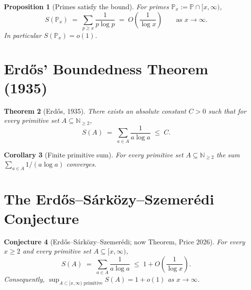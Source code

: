 \documentclass{article}
\newtheorem{theorem}{Theorem}[section]
\newtheorem{proposition}[theorem]{Proposition}
\newtheorem{corollary}[theorem]{Corollary}
\newtheorem{conjecture}[theorem]{Conjecture}
\theoremstyle{definition}
\begin{document}
\begin{proposition}[Primes satisfy the bound]
\label{prop:primes-bound}
For primes $\mathbb{P}_x := \mathbb{P} \cap [x, \infty)$,
\[
  S(\mathbb{P}_x) \;=\; \sum_{p \geq x} \frac{1}{p \log p} \;=\; O\!\left(\frac{1}{\log x}\right)
  \qquad \text{as } x \to \infty.
\]
In particular $S(\mathbb{P}_x) = o(1)$.
\end{proposition}

\section{Erdős' Boundedness Theorem (1935)}

\begin{theorem}[Erdős, 1935]
\label{thm:erdos-1935}
There exists an absolute constant $C > 0$ such that for every primitive
set $A \subseteq \mathbb{N}_{\geq 2}$,
\[
  S(A) \;=\; \sum_{a \in A} \frac{1}{a \log a} \;\leq\; C.
\]
\end{theorem}

\begin{corollary}[Finite primitive sum]
\label{cor:finite-sum}
For every primitive set $A \subseteq \mathbb{N}_{\geq 2}$ the sum
$\sum_{a \in A} 1/(a \log a)$ converges.
\end{corollary}

\section{The Erdős--Sárközy--Szemerédi Conjecture}

\begin{conjecture}[Erdős--Sárközy--Szemerédi; now Theorem, Price 2026]
\label{thm:erdos-1196}
For every $x \geq 2$ and every primitive set $A \subseteq [x, \infty)$,
\[
  S(A) \;=\; \sum_{a \in A} \frac{1}{a \log a} \;\leq\; 1 + O\!\left(\frac{1}{\log x}\right).
\]
Consequently, $\sup_{A \subset [x,\infty) \text{ primitive}} S(A) = 1 + o(1)$
as $x \to \infty$.
\end{conjecture}
\end{document}
